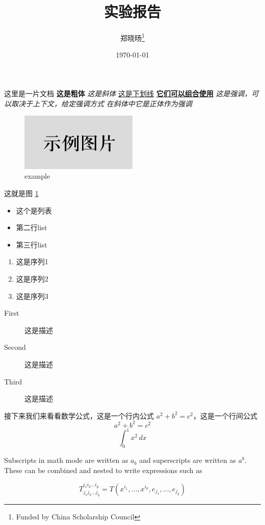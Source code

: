 \documentclass{article}
\title{实验报告}
\author{
    郑晓旸\thanks{Funded by China Scholarship Council}
}
\date{\today}
\begin{document}
\maketitle
这里是一片文档\newline
\textbf{这是粗体}
\newline
\textit{这是斜体}
\newline
\underline{这是下划线}
\newline
\underline{\textbf{它们可以组合使用}}
\newline
\emph{这是强调，可以取决于上下文，给定强调方式}
\newline
\textit{在斜体中\emph{它是正体}作为强调}
\begin{figure}[h]
    \centering
    \includegraphics[width=0.5\textwidth]{example}
    \caption{example}
    \label{fig:example}
\end{figure}

这就是图 \ref{fig:example}
\begin{itemize}
    \item 这个是列表
    \item 第二行list
    \item 第三行list
\end{itemize}
\begin{enumerate}
    \item 这是序列1
    \item 这是序列2
    \item 这是序列3
\end{enumerate}
\begin{description}
    \item[First] 这是描述
    \item[Second] 这是描述
    \item[Third] 这是描述
\end{description}
接下来我们来看看数学公式，这是一个行内公式 $a^2 + b^2 = c^2$，这是一个行间公式
\[
    a^2 + b^2 = c^2
\]
\[
    \int_0^1 x^2 \, dx
\]


Subscripts in math mode are written as $a_b$ and superscripts are written as $a^b$. These can be combined and nested to write expressions such as

\[ T^{i_1 i_2 \dots i_p}_{j_1 j_2 \dots j_q} = T(x^{i_1},\dots,x^{i_p},e_{j_1},\dots,e_{j_q}) \]
 
\end{document}
